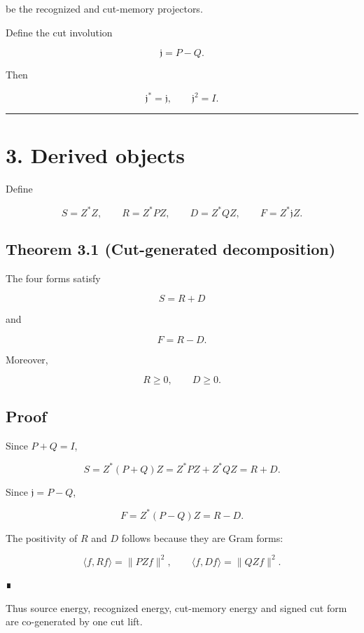 be the recognized and cut-memory projectors.

Define the cut involution

\[
\mathfrak j=P-Q.
\]

Then

\[
\mathfrak j^*=\mathfrak j,
\qquad
\mathfrak j^2=I.
\]

\begin{center}\rule{0.5\linewidth}{0.5pt}\end{center}

\hypertarget{derived-objects}{%
\section{3. Derived objects}\label{derived-objects}}

Define

\[
S=Z^*Z,
\qquad
R=Z^*PZ,
\qquad
D=Z^*QZ,
\qquad
F=Z^*\mathfrak jZ.
\]

\hypertarget{theorem-3.1-cut-generated-decomposition}{%
\subsection{Theorem 3.1 (Cut-generated decomposition)}\label{theorem-3.1-cut-generated-decomposition}}

The four forms satisfy

\[
\boxed{S=R+D}
\]

and

\[
\boxed{F=R-D.}
\]

Moreover,

\[
R\ge0,
\qquad
D\ge0.
\]

\hypertarget{proof}{%
\subsection{Proof}\label{proof}}

Since \(P+Q=I\),

\[
S=Z^*(P+Q)Z=Z^*PZ+Z^*QZ=R+D.
\]

Since \(\mathfrak j=P-Q\),

\[
F=Z^*(P-Q)Z=R-D.
\]

The positivity of \(R\) and \(D\) follows because they are Gram forms:

\[
\langle f,Rf\rangle=\|PZf\|^2,
\qquad
\langle f,Df\rangle=\|QZf\|^2.
\]

∎

Thus source energy, recognized energy, cut-memory energy and signed cut form are
co-generated by one cut lift.

